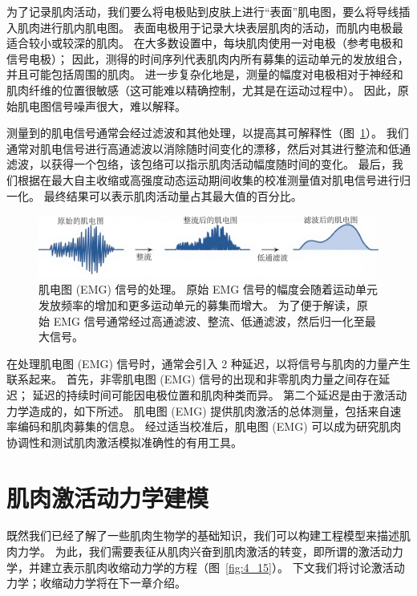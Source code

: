为了记录肌肉活动，我们要么将电极贴到皮肤上进行“表面”肌电图，要么将导线插入肌肉进行肌内肌电图。
表面电极用于记录大块表层肌肉的活动，而肌内电极最适合较小或较深的肌肉。
在大多数设置中，每块肌肉使用一对电极（参考电极和信号电极）；
因此，测得的时间序列代表肌肉内所有募集的运动单元的发放组合，并且可能包括周围的肌肉。
进一步复杂化地是，测量的幅度对电极相对于神经和肌肉纤维的位置很敏感（这可能难以精确控制，尤其是在运动过程中）。
因此，原始肌电图信号噪声很大，难以解释。


测量到的肌电信号通常会经过滤波和其他处理，以提高其可解释性（图~\ref{fig:4_14}）。
我们通常对肌电信号进行高通滤波以消除随时间变化的漂移，然后对其进行整流和低通滤波，以获得一个包络，该包络可以指示肌肉活动幅度随时间的变化。
最后，我们根据在最大自主收缩或高强度动态运动期间收集的校准测量值对肌电信号进行归一化。
最终结果可以表示肌肉活动量占其最大值的百分比。


\begin{figure}[!htb]
	\centering
	\includegraphics[width=1.0\linewidth]{chap4/4_14}
	\caption{肌电图 (EMG) 信号的处理。
		原始 EMG 信号的幅度会随着运动单元发放频率的增加和更多运动单元的募集而增大。
		为了便于解读，原始 EMG 信号通常经过高通滤波、整流、低通滤波，然后归一化至最大信号。 \label{fig:4_14}}
\end{figure}


在处理肌电图 (EMG) 信号时，通常会引入 2 种延迟，以将信号与肌肉的力量产生联系起来。
首先，非零肌电图 (EMG) 信号的出现和非零肌肉力量之间存在延迟；
延迟的持续时间可能因电极位置和肌肉种类而异。
第二个延迟是由于激活动力学造成的，如下所述。
肌电图 (EMG) 提供肌肉激活的总体测量，包括来自速率编码和肌肉募集的信息。
经过适当校准后，肌电图 (EMG) 可以成为研究肌肉协调性和测试肌肉激活模拟准确性的有用工具。


\section{肌肉激活动力学建模}

既然我们已经了解了一些肌肉生物学的基础知识，我们可以构建工程模型来描述肌肉力学。
为此，我们需要表征从肌肉兴奋到肌肉激活的转变，即所谓的激活动力学，并建立表示肌肉收缩动力学的方程（图~\ref{fig:4_15}）。
下文我们将讨论激活动力学；收缩动力学将在下一章介绍。


